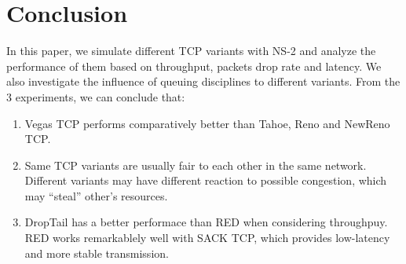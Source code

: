 \documentclass[10pt, conference]{lib/IEEEtran}
\begin{document}
\section{Conclusion}
In this paper, we simulate different TCP variants with NS-2 and analyze the performance of them based on throughput, packets 
drop rate and latency. We also investigate the influence of queuing disciplines to different variants. From the 3 experiments, 
we can conclude that:
\begin{enumerate}
    \item Vegas TCP performs comparatively better than Tahoe, Reno and NewReno TCP.
    \item Same TCP variants are usually fair to each other in the same network. Different variants may have different reaction to possible
    congestion, which may ``steal'' other's resources. 
    \item DropTail has a better performace than RED when considering throughpuy. RED works remarkablely well with SACK TCP, which provides low-latency and more stable transmission.
\end{enumerate}
\end{document}
